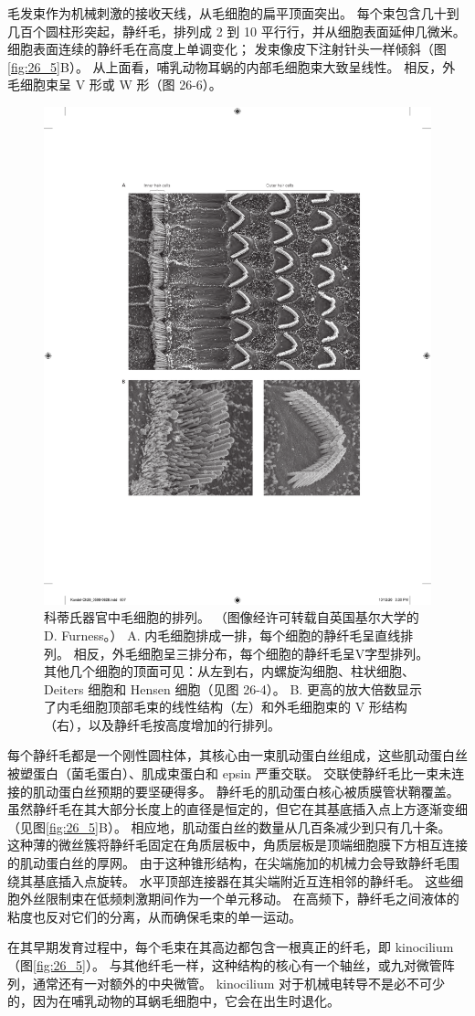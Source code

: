 毛发束作为机械刺激的接收天线，从毛细胞的扁平顶面突出。 
每个束包含几十到几百个圆柱形突起，静纤毛，排列成 2 到 10 平行行，并从细胞表面延伸几微米。 
细胞表面连续的静纤毛在高度上单调变化； 发束像皮下注射针头一样倾斜（图\ref{fig:26_5}B）。 
从上面看，哺乳动物耳蜗的内部毛细胞束大致呈线性。 
相反，外毛细胞束呈 V 形或 W 形（图 26-6）。

\begin{figure}[htbp]
	\centering
	\includegraphics[width=0.5\linewidth]{chap26/fig_26_6}
	\caption{科蒂氏器官中毛细胞的排列。
		（图像经许可转载自英国基尔大学的 D. Furness。） 
		A. 内毛细胞排成一排，每个细胞的静纤毛呈直线排列。 
		相反，外毛细胞呈三排分布，每个细胞的静纤毛呈V字型排列。 
		其他几个细胞的顶面可见：从左到右，内螺旋沟细胞、柱状细胞、Deiters 细胞和 Hensen 细胞（见图 26-4）。 
		B. 更高的放大倍数显示了内毛细胞顶部毛束的线性结构（左）和外毛细胞束的 V 形结构（右），以及静纤毛按高度增加的行排列。}
	\label{fig:26_6}
\end{figure}


每个静纤毛都是一个刚性圆柱体，其核心由一束肌动蛋白丝组成，这些肌动蛋白丝被塑蛋白（菌毛蛋白）、肌成束蛋白和 epsin 严重交联。 
交联使静纤毛比一束未连接的肌动蛋白丝预期的要坚硬得多。 
静纤毛的肌动蛋白核心被质膜管状鞘覆盖。 
虽然静纤毛在其大部分长度上的直径是恒定的，但它在其基底插入点上方逐渐变细（见图\ref{fig:26_5}B）。 
相应地，肌动蛋白丝的数量从几百条减少到只有几十条。 
这种薄的微丝簇将静纤毛固定在角质层板中，角质层板是顶端细胞膜下方相互连接的肌动蛋白丝的厚网。 
由于这种锥形结构，在尖端施加的机械力会导致静纤毛围绕其基底插入点旋转。 
水平顶部连接器在其尖端附近互连相邻的静纤毛。 
这些细胞外丝限制束在低频刺激期间作为一个单元移动。 
在高频下，静纤毛之间液体的粘度也反对它们的分离，从而确保毛束的单一运动。


在其早期发育过程中，每个毛束在其高边都包含一根真正的纤毛，即 kinocilium（图\ref{fig:26_5}）。 
与其他纤毛一样，这种结构的核心有一个轴丝，或九对微管阵列，通常还有一对额外的中央微管。 
kinocilium 对于机械电转导不是必不可少的，因为在哺乳动物的耳蜗毛细胞中，它会在出生时退化。


